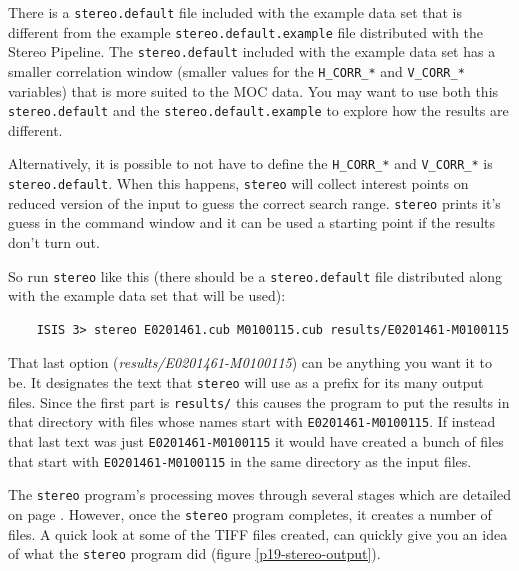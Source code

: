 There is a \texttt{stereo.default} file included with the example
data set that is different from the example \texttt{stereo.default.example}
file distributed with the Stereo Pipeline.  The \texttt{stereo.default}
included with the example data set has a smaller correlation window
(smaller values for the \texttt{H\_CORR\_*} and \texttt{V\_CORR\_*}
variables) that is more suited to the MOC data.  You may want to
use both this \texttt{stereo.default} and the
\texttt{stereo.default.example} to explore how the results are
different.

Alternatively, it is possible to not have to define the
\texttt{H\_CORR\_*} and \texttt{V\_CORR\_*} is
\texttt{stereo.default}. When this happens, \texttt{stereo} will
collect interest points on reduced version of the input to guess the
correct search range. \texttt{stereo} prints it's guess in the command
window and it can be used a starting point if the results don't turn
out.

So run \texttt{stereo} like this (there should be a
\texttt{stereo.default} file distributed along with the example
data set that will be used):

\begin{verbatim}
    ISIS 3> stereo E0201461.cub M0100115.cub results/E0201461-M0100115
\end{verbatim}

\noindent
That last option (\emph{results/E0201461-M0100115}) can be anything you
want it to be.  It designates the text that \texttt{stereo} will use
as a prefix for its many output files.  Since the first part is
\texttt{results/} this causes the program to put the results in that
directory with files whose names start with
\texttt{E0201461-M0100115}. If instead that last text was just
\texttt{E0201461-M0100115} it would have created a bunch of files that
start with \texttt{E0201461-M0100115} in the same directory as the
input files.

The \texttt{stereo} program's processing moves through several
stages which are detailed on page \pageref{entrypoints}.  However,
once the \texttt{stereo} program completes, it creates a number of
files.  A quick look at some of the TIFF files created, can quickly
give you an idea of what the \texttt{stereo} program did (figure
\ref{p19-stereo-output}).

